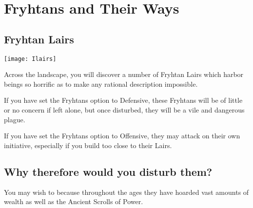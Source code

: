 
\chapter{Fryhtans and Their Ways}

\section{Fryhtan Lairs}


\begin{center}
	\texttt{[image: Ilairs]}
\end{center}

Across the landscape, you will discover a number of Fryhtan Lairs which harbor beings so horrific as to make any rational description impossible.

If you have set the Fryhtans option to Defensive, these Fryhtans will be of little or no concern if left alone, but once disturbed, they will be a vile and dangerous plague.

If you have set the Fryhtans option to Offensive, they may attack on their own initiative, especially if you build too close to their Lairs.

\section{Why therefore would you disturb them?}


You may wish to because throughout the ages they have hoarded vast amounts of wealth as well as the Ancient Scrolls of Power.


